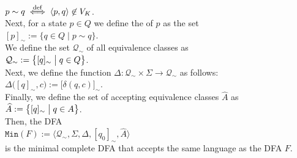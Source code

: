 \\[0.2cm]
\hspace*{1.3cm}
$p \sim q \; \stackrel{\mathrm{def}}{\Longleftrightarrow} \; \pair(p,q) \not\in V_K$.
\\[0.2cm]
Next, for a state $p \in Q$ we define the  of $p$ as the set
\\[0.2cm]
\hspace*{1.3cm}
$[p]_\sim := \{ q \in Q \mid p \sim q \}$.
\\[0.2cm]
We define the set $\mathcal{Q}_\sim$ of all equivalence classes as
\\[0.2cm]
\hspace*{1.3cm}
$\mathcal{Q}_\sim := \bigl\{ [q]_\sim \bigm| q \in Q \bigr\}$.
\\[0.2cm]
Next, we define the function $\Delta: \mathcal{Q}_\sim \times \Sigma \rightarrow \mathcal{Q}_\sim$ as follows:
\\[0.2cm]
\hspace*{1.3cm}
$\Delta\bigl([q]_\sim, c\bigr) := \bigl[ \delta(q, c) \bigr]_\sim$.
\\[0.2cm]
Finally, we define the set of accepting equivalence classes $\widehat{A}$ as
\\[0.2cm]
\hspace*{1.3cm}
$\widehat{A} := \bigl\{ [q]_\sim \bigm| q \in A \bigr\}$.
\\[0.2cm]
Then, the \textsc{DFA}
\\[0.2cm]
\hspace*{1.3cm}
$\mathtt{Min}(F) := \bigl\langle \mathcal{Q}_\sim, \Sigma, \Delta, [q_0]_\sim, \widehat{A} \bigr\rangle$
\\[0.2cm]
is the minimal complete \textsc{DFA} that accepts the same language as the \textsc{DFA} $F$.

